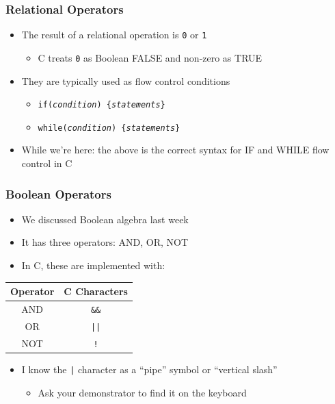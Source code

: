 \documentclass[14pt]{beamer}
\begin{document}
\begin{frame}
\frametitle{Relational Operators}
\begin{itemize}
\item The result of a relational operation is \texttt{0} or \texttt{1}
	\begin{itemize}
		\item C treats \texttt{0} as Boolean FALSE and non-zero as TRUE
	\end{itemize}
\item They are typically used as flow control conditions
	\begin{itemize}
		\item \texttt{if(\textit{condition}) \{\textit{statements}\}}
		\item \texttt{while(\textit{condition}) \{\textit{statements}\}}
	\end{itemize}
\item While we're here: the above is the correct syntax for IF and WHILE flow control in C
\end{itemize}
\end{frame}

\begin{frame}
\frametitle{Boolean Operators}
\begin{itemize}
\item We discussed Boolean algebra last week
\item It has three operators: AND, OR, NOT
\item In C, these are implemented with:
\end{itemize}
\vspace{-5mm}
\begin{table}[]
\begin{tabular}{|c|c|}
\hline
Operator & C Characters \\
\hline
AND      & \texttt{\&\&}         \\
OR       & \texttt{||}           \\
NOT      & \texttt{!}           \\
\hline
\end{tabular}
\end{table}
\vspace{-5mm}
\begin{itemize}
\item I know the \texttt{|} character as a ``pipe'' symbol or ``vertical slash''
	\begin{itemize}
		\item Ask your demonstrator to find it on the keyboard
	\end{itemize}
\end{itemize}
\end{frame}
\end{document}

